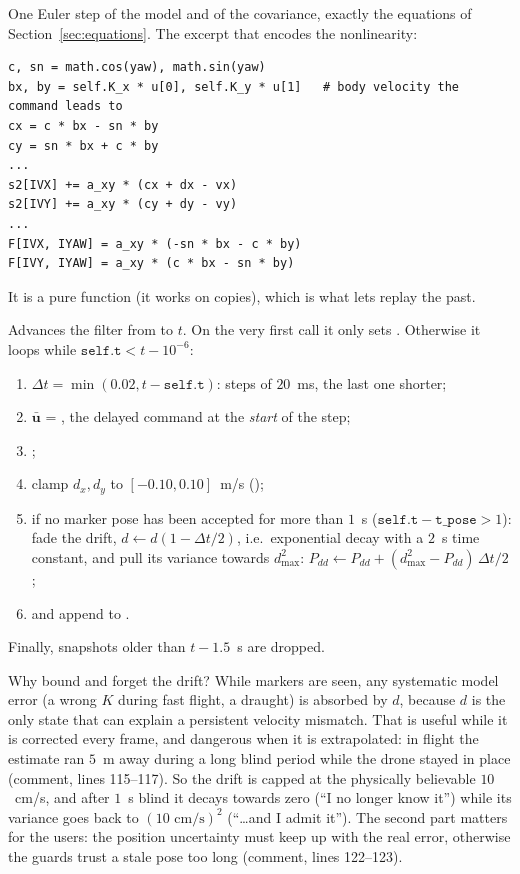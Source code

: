 One Euler step of the model and of the covariance, exactly the equations of Section~\ref{sec:equations}. The excerpt
that encodes the nonlinearity:
\begin{lstlisting}
c, sn = math.cos(yaw), math.sin(yaw)
bx, by = self.K_x * u[0], self.K_y * u[1]   # body velocity the command leads to
cx = c * bx - sn * by
cy = sn * bx + c * by
...
s2[IVX] += a_xy * (cx + dx - vx)
s2[IVY] += a_xy * (cy + dy - vy)
...
F[IVX, IYAW] = a_xy * (-sn * bx - c * by)
F[IVY, IYAW] = a_xy * (c * bx - sn * by)
\end{lstlisting}
It is a pure function (it works on copies), which is what lets  replay the past.

Advances the filter from  to $t$. On the very first call it only sets . Otherwise it loops while
$\texttt{self.t} < t - 10^{-6}$:
\begin{enumerate}[nosep]
\item $\Delta t = \min(0.02, t - \texttt{self.t})$: steps of $20$~ms, the last one shorter;
\item $\bar{\mathbf u}$ = , the delayed command at the \emph{start} of the step;
\item {};
\item clamp $d_x,d_y$ to $[-0.10, 0.10]$~m/s ();
\item if no marker pose has been accepted for more than $1$~s ($\texttt{self.t} - \texttt{t\_pose} > 1$): fade the drift,
  $d \leftarrow d(1 - \Delta t/2)$, i.e.\ exponential decay with a $2$~s time constant, and pull its variance towards
  $d_{\max}^2$: $P_{dd} \leftarrow P_{dd} + (d_{\max}^2 - P_{dd})\,\Delta t/2$;
\item {} and append  to .
\end{enumerate}
Finally, snapshots older than $t - 1.5$~s are dropped.

\begin{intuition}
Why bound and forget the drift? While markers are seen, any systematic model error (a wrong $K$ during fast flight, a
draught) is absorbed by $d$, because $d$ is the only state that can explain a persistent velocity mismatch. That is
useful while it is corrected every frame, and dangerous when it is extrapolated: in flight  the estimate ran
$5$~m away during a long blind period while the drone stayed in place (comment, lines 115--117). So the drift is capped
at the physically believable $10$~cm/s, and after $1$~s blind it decays towards zero (``I no longer know it'') while its
variance goes back to $(10\text{ cm/s})^2$ (``\ldots and I admit it''). The second part matters for the users: the
position uncertainty must keep up with the real error, otherwise the guards trust a stale pose too long (comment, lines
122--123).
\end{intuition}

